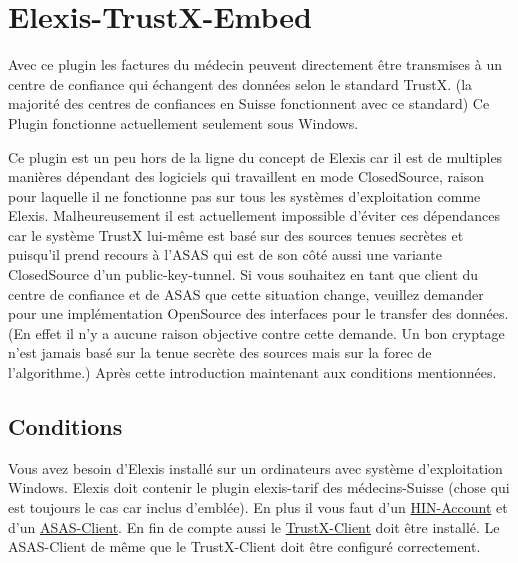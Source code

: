 
\section{Elexis-TrustX-Embed }
\label{trustx}
Avec ce plugin les factures du médecin peuvent directement être transmises à un centre de confiance qui échangent des données selon le standard TrustX. (la majorité des centres de confiances en Suisse  fonctionnent avec ce standard) Ce Plugin fonctionne actuellement seulement sous Windows. 

Ce plugin est un peu hors de la ligne du concept de Elexis car il est de multiples manières dépendant des logiciels qui travaillent en mode ClosedSource, raison pour laquelle il ne fonctionne pas sur tous les systèmes d'exploitation comme Elexis. Malheureusement il est actuellement impossible d'éviter ces dépendances car le système TrustX lui-même est basé sur des sources tenues secrètes et puisqu'il prend recours à l'ASAS qui est de son côté aussi une variante ClosedSource d'un public-key-tunnel.
Si vous souhaitez en tant que client du centre de confiance et de ASAS que cette situation change, veuillez demander pour une implémentation OpenSource des interfaces pour le transfer des données. (En effet il n'y a aucune raison objective contre cette demande. Un bon cryptage n'est jamais basé sur la tenue secrète des sources mais sur la forec de l'algorithme.)
Après cette introduction maintenant aux conditions mentionnées. 

\subsection{Conditions}
Vous avez besoin d'Elexis installé sur un ordinateurs avec système d'exploitation Windows. Elexis doit contenir le plugin elexis-tarif des médecins-Suisse (chose qui est toujours le cas car inclus d'emblée). En plus il vous faut d'un \href{http://www.hin.ch}{HIN-Account} et d'un \href{http://www.hin.ch/asas}{ASAS-Client}. En fin de compte aussi le  \href{http://www.trustx.ch/trustx-praxis/documents/setup-2_1_14.exe}{TrustX-Client} doit être installé. Le ASAS-Client de même que le TrustX-Client doit être  configuré correctement.

